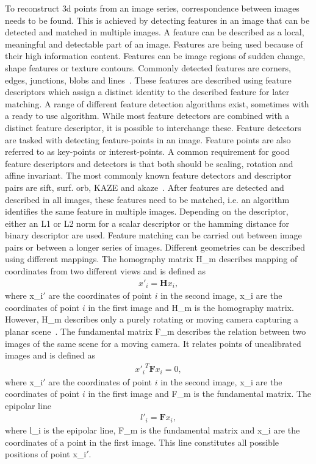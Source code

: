 To reconstruct \gls{3d} points from an image series, correspondence between images needs to be found. This is achieved by detecting features in an image that can be detected and matched in multiple images. A feature can be described as a local, meaningful and detectable part of an image. Features are being used because of their high information content. Features can be image regions of sudden change, shape features or texture contours. Commonly detected features are corners, edges, junctions, blobs and lines~\cite{Tareen2018ABRISK}. These features are described using feature descriptors which assign a distinct identity to the described feature for later matching. A range of different feature detection algorithms  exist, sometimes with a ready to use algorithm. While most feature detectors are combined with a distinct feature descriptor, it is possible to interchange these. Feature detectors are tasked with detecting feature-points in an image. Feature points are also referred to as key-points or interest-points. A common requirement for good feature descriptors and detectors is that both should be scaling, rotation and affine invariant. The most commonly known feature detectors and descriptor pairs are \gls{sift}, \gls{surf}. \gls{orb}, KAZE and \gls{akaze}~\cite{Tareen2018ABRISK}.
After features are detected and described in all images, these features need to be matched, i.e. an algorithm identifies the same feature in multiple images. Depending on the descriptor, either an L1 or L2 norm for a scalar descriptor or the hamming distance for binary descriptor are used. Feature matching can be carried out between image pairs or between a longer series of images. Different geometries can be described using different mappings. The homography matrix \gls{H_m} describes mapping of coordinates from two different views and is defined as
\begin{align}
    x'_i = \textbf{H}x_i, \label{eq:homography_m}
\end{align}
where \gls{x_i}$'$ are the coordinates of point $i$ in the second image, \gls{x_i} are the coordinates of point $i$ in the first image and \gls{H_m} is the homography matrix. However, \gls{H_m} describes only a purely rotating or moving camera capturing a planar scene~\cite{schonberger2016structure}.
The fundamental matrix \gls{F_m} describes the relation between two images of the same scene for a moving camera. It relates points of uncalibrated images and is defined as
\begin{align}
    {x'_i}^{T}\textbf{F}x_i = 0, \label{eq:fundamental_m}
\end{align}
where \gls{x_i}$'$ are the coordinates of point $i$ in the second image, \gls{x_i} are the coordinates of point $i$ in the first image and \gls{F_m} is the fundamental matrix. The epipolar line
\begin{align}
    l'_i = \textbf{F}x_i, \label{eq:epipolar_l}
\end{align}
where \gls{l_i} is the epipolar line, \gls{F_m} is the fundamental matrix and \gls{x_i} are the coordinates of a point in the first image. This line constitutes all possible positions of point \gls{x_i}$'$.

